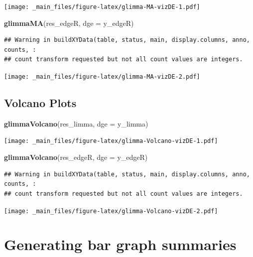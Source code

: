 \documentclass[
]{book}
\newenvironment{Shaded}{\begin{snugshade}}{\end{snugshade}}
\newcommand{\AttributeTok}[1]{\textcolor[rgb]{0.13,0.29,0.53}{#1}}
\newcommand{\FunctionTok}[1]{\textcolor[rgb]{0.13,0.29,0.53}{\textbf{#1}}}
\newcommand{\NormalTok}[1]{#1}
\begin{document}
\texttt{[image: \_main\_files/figure-latex/glimma-MA-vizDE-1.pdf]}

\begin{Shaded}
\begin{Highlighting}[]
\FunctionTok{glimmaMA}\NormalTok{(res\_edgeR, }\AttributeTok{dge =}\NormalTok{ y\_edgeR)}
\end{Highlighting}
\end{Shaded}

\begin{verbatim}
## Warning in buildXYData(table, status, main, display.columns, anno, counts, :
## count transform requested but not all count values are integers.
\end{verbatim}

\texttt{[image: \_main\_files/figure-latex/glimma-MA-vizDE-2.pdf]}

\hypertarget{volcano-plots}{%
\subsection{Volcano Plots}\label{volcano-plots}}

\begin{Shaded}
\begin{Highlighting}[]
\FunctionTok{glimmaVolcano}\NormalTok{(res\_limma, }\AttributeTok{dge =}\NormalTok{ y\_limma)}
\end{Highlighting}
\end{Shaded}

\texttt{[image: \_main\_files/figure-latex/glimma-Volcano-vizDE-1.pdf]}

\begin{Shaded}
\begin{Highlighting}[]
\FunctionTok{glimmaVolcano}\NormalTok{(res\_edgeR, }\AttributeTok{dge =}\NormalTok{ y\_edgeR)}
\end{Highlighting}
\end{Shaded}

\begin{verbatim}
## Warning in buildXYData(table, status, main, display.columns, anno, counts, :
## count transform requested but not all count values are integers.
\end{verbatim}

\texttt{[image: \_main\_files/figure-latex/glimma-Volcano-vizDE-2.pdf]}

\hypertarget{generating-bar-graph-summaries}{%
\section{Generating bar graph summaries}\label{generating-bar-graph-summaries}}
\end{document}

